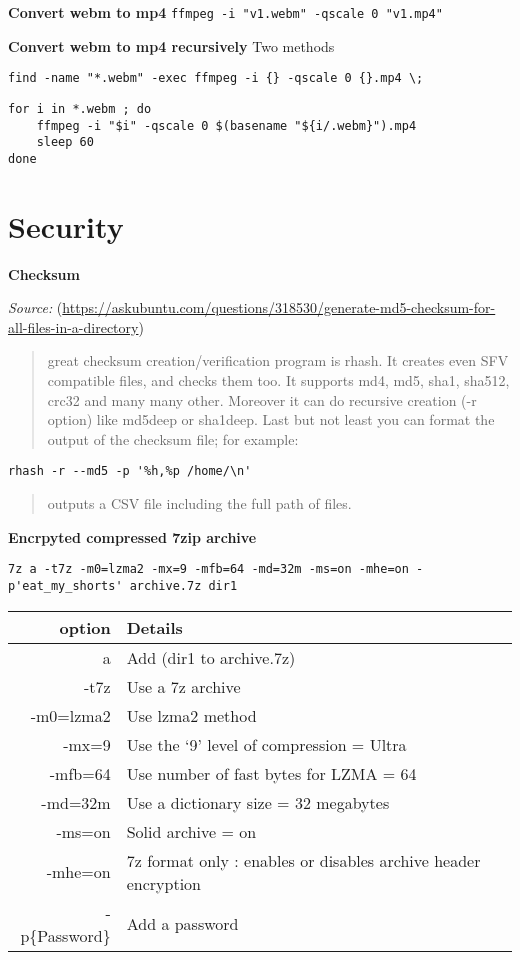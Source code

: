 \documentclass[]{book}
\theoremstyle{definition}
\theoremstyle{definition}
\theoremstyle{definition}
\theoremstyle{remark}
\begin{document}
\textbf{Convert webm to mp4}
\texttt{ffmpeg\ -i\ "v1.webm"\ -qscale\ 0\ "v1.mp4"}

\textbf{Convert webm to mp4 recursively} Two methods

\begin{verbatim}
find -name "*.webm" -exec ffmpeg -i {} -qscale 0 {}.mp4 \;
\end{verbatim}

\begin{verbatim}
for i in *.webm ; do 
    ffmpeg -i "$i" -qscale 0 $(basename "${i/.webm}").mp4
    sleep 60 
done
\end{verbatim}

\section{Security}\label{security}

\textbf{Checksum}

\emph{Source:}
(\url{https://askubuntu.com/questions/318530/generate-md5-checksum-for-all-files-in-a-directory})

\begin{quote}
great checksum creation/verification program is rhash. It creates even
SFV compatible files, and checks them too. It supports md4, md5, sha1,
sha512, crc32 and many many other. Moreover it can do recursive creation
(-r option) like md5deep or sha1deep. Last but not least you can format
the output of the checksum file; for example:
\end{quote}

\begin{verbatim}
rhash -r --md5 -p '%h,%p /home/\n'
\end{verbatim}

\begin{quote}
outputs a CSV file including the full path of files.
\end{quote}

\textbf{Encrpyted compressed 7zip archive}

\begin{verbatim}
7z a -t7z -m0=lzma2 -mx=9 -mfb=64 -md=32m -ms=on -mhe=on -p'eat_my_shorts' archive.7z dir1
\end{verbatim}

\begin{longtable}[]{@{}rl@{}}
\toprule
option & Details\tabularnewline
\midrule
\endhead
a & Add (dir1 to archive.7z)\tabularnewline
-t7z & Use a 7z archive\tabularnewline
-m0=lzma2 & Use lzma2 method\tabularnewline
-mx=9 & Use the `9' level of compression = Ultra\tabularnewline
-mfb=64 & Use number of fast bytes for LZMA = 64\tabularnewline
-md=32m & Use a dictionary size = 32 megabytes\tabularnewline
-ms=on & Solid archive = on\tabularnewline
-mhe=on & 7z format only : enables or disables archive header
encryption\tabularnewline
-p\{Password\} & Add a password\tabularnewline
\bottomrule
\end{longtable}
\end{document}
